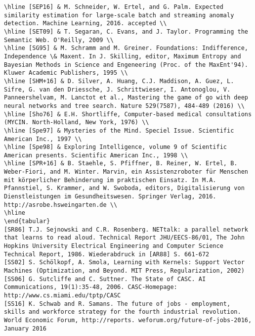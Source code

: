 \documentclass[10pt]{article}
\begin{document}
\begin{verbatim}
\hline [SEP16] & M. Schneider, W. Ertel, and G. Palm. Expected similarity estimation for large-scale batch and streaming anomaly detection. Machine Learning, 2016. accepted \\
\hline [SET09] & T. Segaran, C. Evans, and J. Taylor. Programming the Semantic Web. O'Reilly, 2009 \\
\hline [SG95] & M. Schramm and M. Greiner. Foundations: Indifference, Independence \& Maxent. In J. Skilling, editor, Maximum Entropy and Bayesian Methods in Science and Engeneering (Proc. of the MaxEnt'94). Kluwer Academic Publishers, 1995 \\
\hline [SHM+16] & D. Silver, A. Huang, C.J. Maddison, A. Guez, L. Sifre, G. van den Driessche, J. Schrittwieser, I. Antonoglou, V. Panneershelvam, M. Lanctot et al., Mastering the game of go with deep neural networks and tree search. Nature 529(7587), 484-489 (2016) \\
\hline [Sho76] & E.H. Shortliffe, Computer-based medical consultations (MYCIN. North-Holland, New York, 1976) \\
\hline [Spe97] & Mysteries of the Mind. Speciel Issue. Scientific American Inc., 1997 \\
\hline [Spe98] & Exploring Intelligence, volume 9 of Scientific American presents. Scientific American Inc., 1998 \\
\hline [SPR+16] & B. Staehle, S. Pfiffner, B. Reiner, W. Ertel, B. Weber-Fiori, and M. Winter. Marvin, ein Assistenzroboter für Menschen mit körperlicher Behinderung im praktischen Einsatz. In M.A. Pfannstiel, S. Krammer, and W. Swoboda, editors, Digitalisierung von Dienstleistungen im Gesundheitswesen. Springer Verlag, 2016. http://asrobe.hsweingarten.de \\
\hline
\end{tabular}
[SR86] T.J. Sejnowski and C.R. Rosenberg. NETtalk: a parallel network that learns to read aloud. Technical Report JHU/EECS-86/01, The John Hopkins University Electrical Engineering and Computer Science Technical Report, 1986. Wiederabdruck in [AR88] S. 661-672
[SS02] S. Schölkopf, A. Smola, Learning with Kernels: Support Vector Machines (Optimization, and Beyond. MIT Press, Regularization, 2002)
[SS06] G. Sutcliffe and C. Suttner. The State of CASC. AI Communications, 19(1):35-48, 2006. CASC-Homepage: http://www.cs.miami.edu/tptp/CASC
[SS16] K. Schwab and R. Samans. The future of jobs - employment, skills and workforce strategy for the fourth industrial revolution. World Economic Forum, http://reports. weforum.org/future-of-jobs-2016, January 2016

\end{verbatim}
\end{document}
